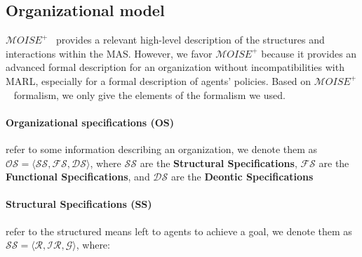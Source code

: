 \documentclass[sn-mathphys-num]{sn-jnl}%
\theoremstyle{thmstyleone}%
\theoremstyle{thmstyletwo}%
\theoremstyle{thmstylethree}%
\begin{document}
\subsection{Organizational model}

$\mathcal{M}OISE^+$~\cite{hubner2007} provides a relevant high-level description of the structures and interactions within the MAS. However, we favor $\mathcal{M}OISE^+$ because it provides an advanced formal description for an organization without incompatibilities with MARL, especially for a formal description of agents' policies.
Based on $\mathcal{M}OISE^+$~\cite{hubner2007} formalism, we only give the elements of the formalism we used.

\paragraph{\textbf{Organizational specifications (OS)}} refer to some information describing an organization, we denote them as $\mathcal{OS} = \langle \mathcal{SS}, \mathcal{FS}, \mathcal{DS} \rangle$, where $\mathcal{SS}$ are the \textbf{Structural Specifications}, $\mathcal{FS}$ are the \textbf{Functional Specifications}, and $\mathcal{DS}$ are the \textbf{Deontic Specifications}

\paragraph{\textbf{Structural Specifications (SS)}} refer to the structured means left to agents to achieve a goal, we denote them as $\mathcal{SS} = \langle \mathcal{R}, \mathcal{IR}, \mathcal{G} \rangle$, where:
\end{document}
